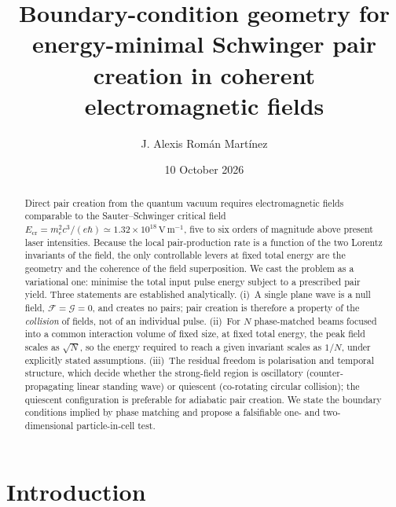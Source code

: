 \documentclass[aps,prd,reprint,superscriptaddress,nofootinbib,floatfix]{revtex4-2}
\begin{document}
\title{Boundary-condition geometry for energy-minimal Schwinger pair creation
in coherent electromagnetic fields}

\author{J. Alexis Rom\'an Mart\'inez}

\date{10 October 2026}

\begin{abstract}
Direct pair creation from the quantum vacuum requires electromagnetic fields
comparable to the Sauter--Schwinger critical field
$E_{\mathrm{cr}}=m_e^2c^3/(e\hbar)\simeq1.32\times10^{18}\,\mathrm{V\,m^{-1}}$,
five to six orders of magnitude above present laser intensities. Because the
local pair-production rate is a function of the two Lorentz invariants of the
field, the only controllable levers at fixed total energy are the geometry and
the coherence of the field superposition. We cast the problem as a variational
one: minimise the total input pulse energy subject to a prescribed pair yield.
Three statements are established analytically. (i)~A single plane wave is a
null field, $\mathcal{F}=\mathcal{G}=0$, and creates no pairs; pair creation is
therefore a property of the \emph{collision} of fields, not of an individual
pulse. (ii)~For $N$ phase-matched beams focused into a common interaction
volume of fixed size, at fixed total energy, the peak field scales as
$\sqrt{N}$, so the energy required to reach a given invariant scales as
$1/N$, under explicitly stated assumptions.
(iii)~The residual freedom is polarisation and temporal structure, which decide
whether the strong-field region is oscillatory (counter-propagating linear
standing wave) or quiescent (co-rotating circular collision); the quiescent
configuration is preferable for adiabatic pair creation. We state the boundary
conditions implied by phase matching and propose a falsifiable one- and
two-dimensional particle-in-cell test.
\end{abstract}

\maketitle

\section{Introduction}
\end{document}
